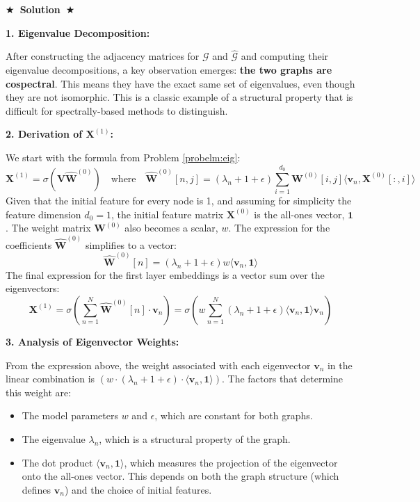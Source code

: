 \documentclass{article}
\numberwithin{figure}{section}
\newcommand{\Solution}[1]{%
    {%
        \medskip
        \color{red}
        \bf $\bigstar$~\sf\textbf{Solution}~$\bigstar$ \sf
        #1
    }
    \bigskip
}
\begin{document}
\Solution{
	
	\textbf{1. Eigenvalue Decomposition:}
	
	After constructing the adjacency matrices for $\mathcal{G}$ and $\hat{\mathcal{G}}$ and computing their eigenvalue decompositions, a key observation emerges: \textbf{the two graphs are cospectral}. This means they have the exact same set of eigenvalues, even though they are not isomorphic. This is a classic example of a structural property that is difficult for spectrally-based methods to distinguish.
	
	\vspace{1em}
	\textbf{2. Derivation of $\mathbf{X}^{(1)}$:}
	
	We start with the formula from Problem \ref{probelm:eig}:
	\[ \mathbf{X}^{(1)} = \sigma\left(\mathbf{V} \hat{\mathbf{W}}^{(0)}\right) \quad \text{where} \quad \hat{\mathbf{W}}^{(0)}\left[n, j\right] = \left(\lambda_n+1+\epsilon\right) \sum_{i=1}^{d_0}\mathbf{W}^{(0)}[i,j]\langle\mathbf{v}_n,\mathbf{X}^{(0)}\left[:,i\right]\rangle \]
	Given that the initial feature for every node is 1, and assuming for simplicity the feature dimension $d_0=1$, the initial feature matrix $\mathbf{X}^{(0)}$ is the all-ones vector, $\mathbf{1}$. The weight matrix $\mathbf{W}^{(0)}$ also becomes a scalar, $w$.
	The expression for the coefficients $\hat{\mathbf{W}}^{(0)}$ simplifies to a vector:
	\[ \hat{\mathbf{W}}^{(0)}[n] = \left(\lambda_n+1+\epsilon\right) w \langle\mathbf{v}_n, \mathbf{1}\rangle \]
	The final expression for the first layer embeddings is a vector sum over the eigenvectors:
	\[ \mathbf{X}^{(1)} = \sigma\left( \sum_{n=1}^N \hat{\mathbf{W}}^{(0)}[n] \cdot \mathbf{v}_n \right) = \sigma\left( w \sum_{n=1}^N \left(\lambda_n+1+\epsilon\right) \langle\mathbf{v}_n, \mathbf{1}\rangle \mathbf{v}_n \right) \]
	
	\vspace{1em}
	\textbf{3. Analysis of Eigenvector Weights:}
	
	From the expression above, the weight associated with each eigenvector $\mathbf{v}_n$ in the linear combination is $\left(w \cdot (\lambda_n+1+\epsilon) \cdot \langle\mathbf{v}_n, \mathbf{1}\rangle\right)$.
	The factors that determine this weight are:
	\begin{itemize}
		\item The model parameters $w$ and $\epsilon$, which are constant for both graphs.
		\item The eigenvalue $\lambda_n$, which is a structural property of the graph.
		\item The dot product $\langle\mathbf{v}_n, \mathbf{1}\rangle$, which measures the projection of the eigenvector onto the all-ones vector. This depends on both the graph structure (which defines $\mathbf{v}_n$) and the choice of initial features.
	\end{itemize}
	
}
\end{document}
